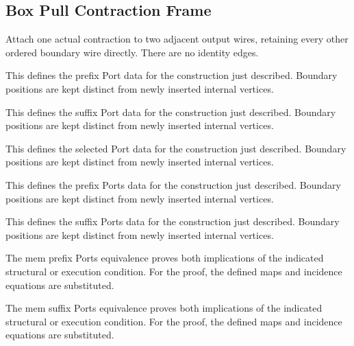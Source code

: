 \subsection{Box Pull Contraction Frame}
Attach one actual contraction to two adjacent output wires, retaining every other ordered boundary wire directly. There are no identity edges.

This defines the prefix Port data for the construction just described. Boundary positions are kept distinct from newly inserted internal vertices.
\par{}

This defines the suffix Port data for the construction just described. Boundary positions are kept distinct from newly inserted internal vertices.
\par{}

This defines the selected Port data for the construction just described. Boundary positions are kept distinct from newly inserted internal vertices.
\par{}

This defines the prefix Ports data for the construction just described. Boundary positions are kept distinct from newly inserted internal vertices.
\par{}

This defines the suffix Ports data for the construction just described. Boundary positions are kept distinct from newly inserted internal vertices.
\par{}

The mem prefix Ports equivalence proves both implications of the indicated structural or execution condition.
For the proof, the defined maps and incidence equations are substituted.
\par{}

The mem suffix Ports equivalence proves both implications of the indicated structural or execution condition.
For the proof, the defined maps and incidence equations are substituted.
\par{}

